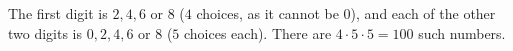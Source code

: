 The first digit is $2,4,6$ or $8$ ($4$ choices, as it cannot be $0$), and each of the other two digits is $0,2,4,6$ or $8$ ($5$ choices each). There are $4\cdot5\cdot5=\boxed{100}$ such numbers.
